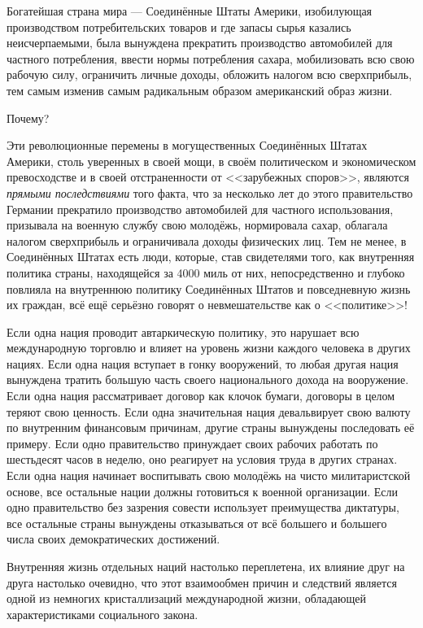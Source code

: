 Богатейшая страна мира — Соединённые Штаты Америки, изобилующая производством потребительских товаров и где запасы сырья казались неисчерпаемыми, была вынуждена прекратить производство автомобилей для частного потребления, ввести нормы потребления сахара, мобилизовать всю свою рабочую силу, ограничить личные доходы, обложить налогом всю сверхприбыль, тем самым изменив самым радикальным образом американский образ жизни.
 
Почему?

Эти революционные перемены в могущественных Соединённых Штатах Америки, столь уверенных в своей мощи, в своём политическом и экономическом превосходстве и в своей отстраненности от <<зарубежных споров>>, являются \textit{прямыми последствиями} того факта, что за несколько лет до этого правительство Германии прекратило производство автомобилей для частного использования, призывала на военную службу свою молодёжь, нормировала сахар, облагала налогом сверхприбыль и ограничивала доходы физических лиц. Тем не менее, в Соединённых Штатах есть люди, которые, став свидетелями того, как внутренняя политика страны, находящейся за 4000 миль от них, непосредственно и глубоко повлияла на внутреннюю политику Соединённых Штатов и повседневную жизнь их граждан, всё ещё серьёзно говорят о невмешательстве как о <<политике>>!
 
Если одна нация проводит автаркическую политику, это нарушает всю международную торговлю и влияет на уровень жизни каждого человека в других нациях. Если одна нация вступает в гонку вооружений, то любая другая нация вынуждена тратить большую часть своего национального дохода на вооружение. Если одна нация рассматривает договор как клочок бумаги, договоры в целом теряют свою ценность. Если одна значительная нация девальвирует свою валюту по внутренним финансовым причинам, другие страны вынуждены последовать её примеру. Если одно правительство принуждает своих рабочих работать по шестьдесят часов в неделю, оно реагирует на условия труда в других странах. Если одна нация начинает воспитывать свою молодёжь на чисто милитаристской основе, все остальные нации должны готовиться к военной организации. Если одно правительство без зазрения совести использует преимущества диктатуры, все остальные страны вынуждены отказываться от всё большего и большего числа своих демократических достижений.

Внутренняя жизнь отдельных наций настолько переплетена, их влияние друг на друга настолько очевидно, что этот взаимообмен причин и следствий является одной из немногих кристаллизаций международной жизни, обладающей характеристиками социального закона.
 
